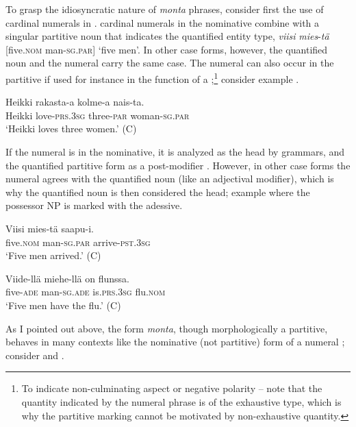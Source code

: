 \documentclass[output=paper]{LSP/langsci}
\begin{document}
To grasp the idiosyncratic nature of \textit{monta} phrases, consider first the use of cardinal numerals in .  cardinal numerals in the nominative combine with a singular partitive noun that indicates the quantified entity type, \eg \textit{viisi} \textit{mies}-\textit{tä} [five.\textsc{nom} man-\textsc{sg}.\textsc{par}] ‘five men’. In other case forms, however, the quantified noun and the numeral carry the same case. The numeral can also occur in the partitive if used for instance in the function of a ;\footnote{To indicate non-culminating aspect or negative polarity – note that the quantity indicated by the numeral phrase is of the exhaustive type, which is why the partitive marking cannot be motivated by non-exhaustive quantity.} consider example .

\ea%
\label{15-hu-ex:49}

\gll Heikki rakasta-a kolme-a nais-ta.\\
Heikki love-\textsc{prs}.\textsc{3sg} three-\textsc{par} woman-\textsc{sg}.\textsc{par}\\
\glt ‘Heikki loves three women.’  (C)
\z

If the numeral is in the nominative, it is analyzed as the head by grammars, and the quantified partitive form as a post-modifier . However, in other case forms the numeral agrees with the quantified noun (like an adjectival modifier), which is why the quantified noun is then considered the head; \cf example  where the possessor NP is marked with the adessive.

\ea%
\label{15-hu-ex:50}

\gll Viisi mies-tä saapu-i.\\
five.\textsc{nom} man-\textsc{sg}.\textsc{par} arrive-\textsc{pst}.\textsc{3sg}\\
\glt `Five men arrived.’  (C)
\z

\ea%
\label{15-hu-ex:51}

\gll Viide-llä miehe-llä on flunssa.\\
five-\textsc{ade} man-\textsc{sg}.\textsc{ade} is.\textsc{prs}.\textsc{3sg} flu.\textsc{nom}\\
\glt ‘Five men have the flu.’  (C)
\z

As I pointed out above, the form \textit{monta}, though morphologically a partitive, behaves in many contexts like the nominative (not partitive) form of a numeral \citep{Branch2001Montaa}; consider  and . 
\end{document}
